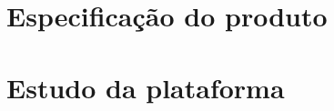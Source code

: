 \documentclass{normas-utf-tex_07_2012} %
\numberwithin{equation}{chapter} %
\begin{document}
\chapter{Especificação do produto} \label{cap:especificacao_produto}



\chapter{Estudo da plataforma} \label{cap:estudo_plataforma}





\nocite{sumo_overview} %


% 
\end{document}
